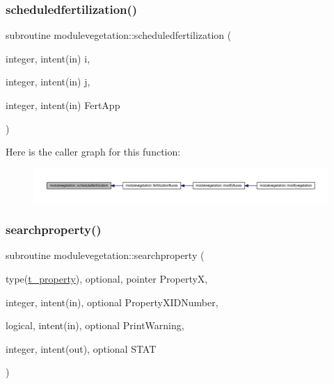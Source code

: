 \subsubsection{\texorpdfstring{scheduledfertilization()}{scheduledfertilization()}}
{\footnotesize\ttfamily subroutine modulevegetation\+::scheduledfertilization (\begin{DoxyParamCaption}\item[{integer, intent(in)}]{i,  }\item[{integer, intent(in)}]{j,  }\item[{integer, intent(in)}]{Fert\+App }\end{DoxyParamCaption})\hspace{0.3cm}{\ttfamily [private]}}

Here is the caller graph for this function\+:\nopagebreak
\begin{figure}[H]
\begin{center}
\leavevmode
\includegraphics[width=350pt]{namespacemodulevegetation_a61c84b3c83334d731a2e537c7f0373fc_icgraph}
\end{center}
\end{figure}
\mbox{\label{namespacemodulevegetation_aaa44ba5345b19bc2d7499a1e5643a52e}} 
\subsubsection{\texorpdfstring{searchproperty()}{searchproperty()}}
{\footnotesize\ttfamily subroutine modulevegetation\+::searchproperty (\begin{DoxyParamCaption}\item[{type(\mbox{\hyperlink{structmodulevegetation_1_1t__property}{t\+\_\+property}}), optional, pointer}]{PropertyX,  }\item[{integer, intent(in), optional}]{Property\+X\+I\+D\+Number,  }\item[{logical, intent(in), optional}]{Print\+Warning,  }\item[{integer, intent(out), optional}]{S\+T\+AT }\end{DoxyParamCaption})\hspace{0.3cm}{\ttfamily [private]}}


